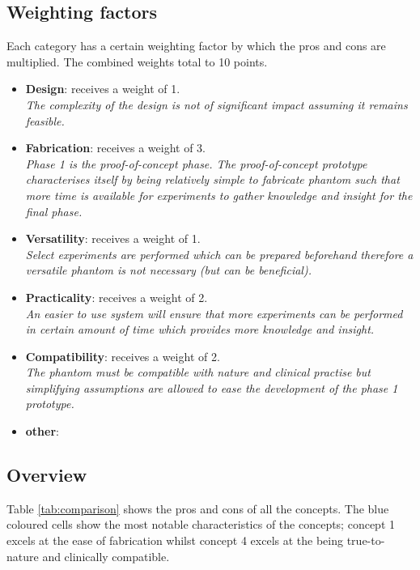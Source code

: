 \subsection{Weighting factors}
Each category has a certain weighting factor by which the pros and cons are multiplied. The combined weights total to 10 points. 
\begin{itemize}
	\item \textbf{Design}: receives a weight of 1. \\ \textit{The complexity of the design is not of significant impact assuming it remains feasible.}
	\item \textbf{Fabrication}: receives a weight of 3. \\ \textit{Phase 1 is the proof-of-concept phase. The proof-of-concept prototype characterises itself by being relatively simple to fabricate phantom such that more time is available for experiments to gather knowledge and insight for the final phase.}
	\item \textbf{Versatility}: receives a weight of 1. \\ \textit{Select experiments are performed which can be prepared beforehand therefore a versatile phantom is not necessary (but can be beneficial).}
	\item \textbf{Practicality}: receives a weight of 2. \\ \textit{An easier to use system will ensure that more experiments can be performed in certain amount of time which provides more knowledge and insight.}
	\item \textbf{Compatibility}: receives a weight of 2. \\ \textit{The phantom must be compatible with nature and clinical practise but simplifying assumptions are allowed to ease the development of the phase 1 prototype.}
	\item \textbf{other}:
\end{itemize}


\subsection{Overview}
Table \ref{tab:comparison} shows the pros and cons of all the concepts. The blue coloured cells show the most notable characteristics of the concepts; concept 1 excels at the ease of fabrication whilst concept 4 excels at the being true-to-nature and clinically compatible. 

